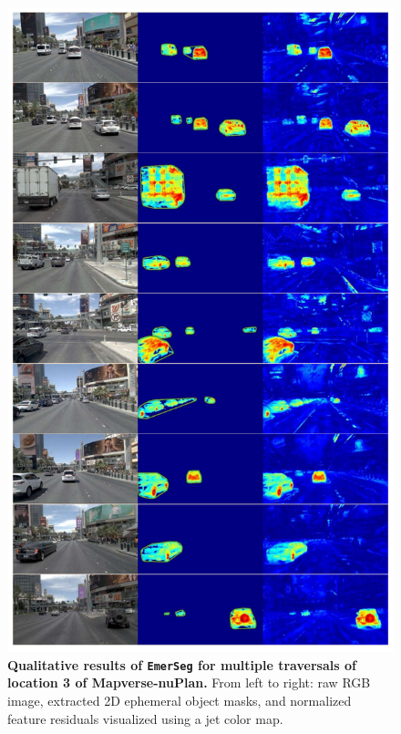 \begin{figure}[ht]
    \centering
    \includegraphics[width=0.88\linewidth]{figs_compressed/EmerSeg-loc3_compressed.pdf}
    \caption{\textbf{Qualitative results of \texttt{EmerSeg} for multiple traversals of location 3 of Mapverse-nuPlan.} From left to right: raw RGB image, extracted 2D ephemeral object masks, and normalized feature residuals visualized using a jet color map.}
    \label{fig:vegas-loc3}
\end{figure}

